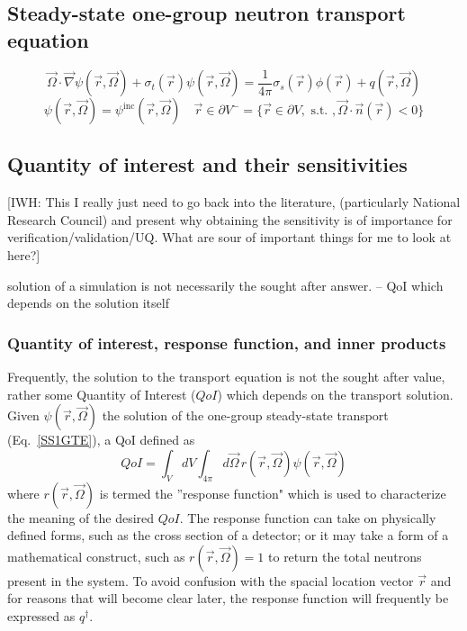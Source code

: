 \documentclass{article}
\newcommand{\vr}{\vec{r}}
\newcommand{\vO}{\vec{\Omega}}
\newcommand{\vgrad}{\vec{\nabla}}
\newcommand{\sigt}{\sigma_t}
\newcommand{\sigs}{\sigma_s}
\newcommand{\qoi}{QoI}
\begin{document}
\subsection{Steady-state one-group neutron transport equation}


\begin{equation}
\label{SS1GTE}
\vO \cdot \vgrad \psi(\vr,\vO) + \sigt(\vr) \psi(\vr,\vO) = \frac{1}{4 \pi} \sigs(\vr) \phi(\vr) + q(\vr,\vO) 
\end{equation}
\begin{equation}
\psi(\vr,\vO) = \psi^{\text{inc}}(\vr,\vO) \quad \vr \in \partial V^{-} = \{ \vr \in \partial V, \text{ s.t. }, \vO \cdot \vec{n}(\vr) < 0\}
\end{equation}
\subsection{Quantity of interest and their sensitivities}

{\color{red}[IWH: This I really just need to go back into the literature, (particularly National Research Council) and present why obtaining the sensitivity is of importance for verification/validation/UQ. What are sour of important things for me to look at here?]}

solution of a simulation is not necessarily the sought after answer. -- QoI which depends on the solution itself

\subsubsection{Quantity of interest, response function, and inner products}
Frequently, the solution to the transport equation is not the sought after value, rather some Quantity of Interest ($\qoi$) which depends on the transport solution. Given $\psi(\vr,\vO)$ the solution of the one-group steady-state transport (Eq.~\eqref{SS1GTE}), a QoI
defined as
\begin{equation}
\qoi =  \int_V dV \int_{4 \pi} d \vO \,  r(\vr, \vO) \psi(\vr, \vO)
\end{equation}
where $ r(\vr, \vO)$ is termed the ''response function" which is used to characterize the meaning of the desired $\qoi$. The response function can take on physically defined forms, such as the cross section of a detector; or it may take a form of a mathematical construct, such as $r(\vr, \vO)=1$ to return the total neutrons present in the system. To avoid confusion with the spacial location vector $\vr$ and for reasons that will become clear later, the response function will frequently be expressed as $q^\dag$.
\end{document}
